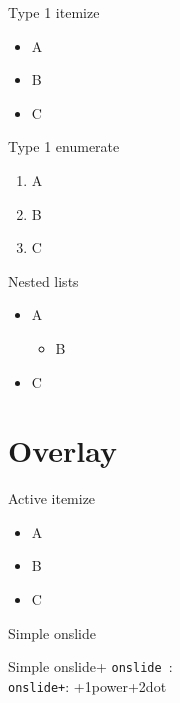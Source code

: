 \documentclass[
 size=12pt,
 paper=smartboard, %
 mode=present, %
 display=slides, %
style=tulip,
pauseslide,
fleqn,leqno,clock]{powerdot}
\begin{document}
\begin{slide}{Type 1 itemize}
\begin{itemize}[type=1]
\item A \pause
\item B \pause
\item C
\end{itemize}
\end{slide}

\begin{slide}{Type 1 enumerate}
\begin{enumerate}[type=1]%
\item A \pause
\item B \pause
\item C
\end{enumerate}
\end{slide}


\begin{slide}{Nested lists}
\begin{itemize}
\item A\pause
\begin{itemize}[type=1]
\item B\pause
\end{itemize}
\item C
\end{itemize}
\end{slide}

\section{Overlay}

\begin{slide}{Active itemize}
\begin{itemize}[type=1]
\item<1> A
\item<2> B
\item<3> C
\end{itemize}
\end{slide}

\begin{slide}{Simple onslide}
\end{slide}

\begin{slide}{Simple onslide+}
\texttt{onslide }: \\
\texttt{onslide+}: \onslide+{1}{power}\onslide+{2}{dot}
\end{slide}
\end{document}
